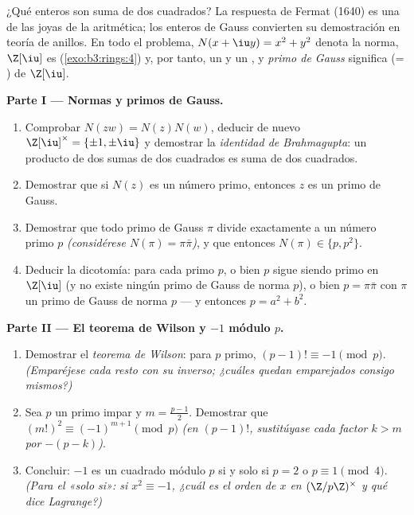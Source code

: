 \begin{problem}\label{pb:b3:rings:1}
¿Qué enteros son suma de dos cuadrados? La respuesta de Fermat (1640) es
una de las joyas de la aritmética; los enteros de Gauss convierten su
demostración en teoría de anillos. En todo el problema,
$N(x + \iu y) = x^2 + y^2$ denota la norma, $\Z[\iu]$ es
 (\cref{exo:b3:rings:4}) y, por
tanto, un  y un
, y \emph{primo de Gauss} significa
 (= ) de
$\Z[\iu]$.

\medskip
\noindent\textbf{Parte I --- Normas y primos de Gauss.}
\begin{enumerate}
  \item Comprobar $N(zw) = N(z)N(w)$, deducir de nuevo $\Z[\iu]^\times =
        \{\pm1, \pm\iu\}$ y demostrar la \emph{identidad de
  Brahmagupta}: un producto de dos sumas de dos cuadrados es suma de dos
  cuadrados. \item Demostrar que si $N(z)$ es un número primo, entonces
  $z$ es un primo de Gauss. \item Demostrar que todo primo de Gauss
  $\pi$ divide exactamente a un número primo $p$ \emph{(considérese
  $N(\pi) = \pi\bar\pi$)}, y que entonces $N(\pi) \in \{p, p^2\}$. \item
  Deducir la dicotomía: para cada primo $p$, o bien $p$ sigue siendo
  primo en $\Z[\iu]$ (y no existe ningún primo de Gauss de norma $p$), o
  bien $p = \pi\bar\pi$ con $\pi$ un primo de Gauss de norma $p$ --- y
  entonces $p = a^2 + b^2$.
\end{enumerate}

\medskip
\noindent\textbf{Parte II --- El teorema de Wilson y $-1$ módulo
$p$.}
\begin{enumerate}[resume]
  \item Demostrar el \emph{teorema de Wilson}: para $p$ primo, $(p-1)!
        \equiv -1 \pmod p$. \emph{(Emparéjese cada resto con su inverso;
  ¿cuáles quedan emparejados consigo mismos?)} \item Sea $p$ un primo
  impar y $m = \frac{p-1}2$. Demostrar que
  $(m!)^2 \equiv (-1)^{m+1} \pmod p$ \emph{(en $(p-1)!$, sustitúyase
  cada factor $k > m$ por $-(p - k)$)}. \item Concluir: $-1$ es un
  cuadrado módulo $p$ si y solo si $p = 2$ o $p
        \equiv 1 \pmod 4$. \emph{(Para el «solo si»: si $x^2
        \equiv -1$, ¿cuál es el orden de $x$ en $(\Z/p\Z)^\times$ y qué
  dice Lagrange?)}
\end{enumerate}


\end{problem}
